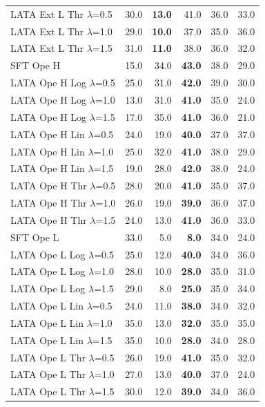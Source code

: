 \begin{longtable}{lrrrrr}
LATA Ext L Thr $\lambda$=0.5 & 30.0 & \textbf{13.0} & 41.0 & 36.0 & 33.0 \\
LATA Ext L Thr $\lambda$=1.0 & 29.0 & \textbf{10.0} & 37.0 & 35.0 & 36.0 \\
LATA Ext L Thr $\lambda$=1.5 & 31.0 & \textbf{11.0} & 38.0 & 36.0 & 32.0 \\
SFT Ope H & 15.0 & 34.0 & \textbf{43.0} & 38.0 & 29.0 \\
LATA Ope H Log $\lambda$=0.5 & 25.0 & 31.0 & \textbf{42.0} & 39.0 & 30.0 \\
LATA Ope H Log $\lambda$=1.0 & 13.0 & 31.0 & \textbf{41.0} & 35.0 & 24.0 \\
LATA Ope H Log $\lambda$=1.5 & 17.0 & 35.0 & \textbf{41.0} & 36.0 & 21.0 \\
LATA Ope H Lin $\lambda$=0.5 & 24.0 & 19.0 & \textbf{40.0} & 37.0 & 37.0 \\
LATA Ope H Lin $\lambda$=1.0 & 25.0 & 32.0 & \textbf{41.0} & 38.0 & 29.0 \\
LATA Ope H Lin $\lambda$=1.5 & 19.0 & 28.0 & \textbf{42.0} & 38.0 & 24.0 \\
LATA Ope H Thr $\lambda$=0.5 & 28.0 & 20.0 & \textbf{41.0} & 35.0 & 37.0 \\
LATA Ope H Thr $\lambda$=1.0 & 26.0 & 19.0 & \textbf{39.0} & 36.0 & 37.0 \\
LATA Ope H Thr $\lambda$=1.5 & 24.0 & 13.0 & \textbf{41.0} & 36.0 & 33.0 \\
SFT Ope L & 33.0 & 5.0 & \textbf{8.0} & 34.0 & 24.0 \\
LATA Ope L Log $\lambda$=0.5 & 25.0 & 12.0 & \textbf{40.0} & 34.0 & 36.0 \\
LATA Ope L Log $\lambda$=1.0 & 28.0 & 10.0 & \textbf{28.0} & 35.0 & 31.0 \\
LATA Ope L Log $\lambda$=1.5 & 29.0 & 8.0 & \textbf{25.0} & 35.0 & 34.0 \\
LATA Ope L Lin $\lambda$=0.5 & 24.0 & 11.0 & \textbf{38.0} & 34.0 & 32.0 \\
LATA Ope L Lin $\lambda$=1.0 & 35.0 & 13.0 & \textbf{32.0} & 35.0 & 35.0 \\
LATA Ope L Lin $\lambda$=1.5 & 35.0 & 10.0 & \textbf{28.0} & 34.0 & 28.0 \\
LATA Ope L Thr $\lambda$=0.5 & 26.0 & 19.0 & \textbf{41.0} & 35.0 & 32.0 \\
LATA Ope L Thr $\lambda$=1.0 & 27.0 & 13.0 & \textbf{40.0} & 37.0 & 24.0 \\
LATA Ope L Thr $\lambda$=1.5 & 30.0 & 12.0 & \textbf{39.0} & 34.0 & 36.0 \\

\end{longtable}
